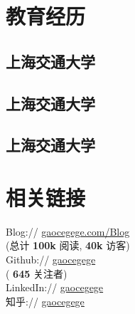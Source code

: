 \documentclass[]{deedy-resume-openfont}
\begin{document}
%
%
\lastupdated


%
%

\begin{minipage}[t]{0.3\textwidth}


\section{教育经历}
\sectionsep

\subsection{上海交通大学}
\sectionsep

\subsection{上海交通大学}
\sectionsep

\subsection{上海交通大学}
\sectionsep


\section{相关链接}
\sectionsep
Blog://  \href{http://gaocegege.com/Blog}{gaocegege.com/Blog} \\
{(总计\textbf{ 100k }阅读,\textbf{ 40k }访客)} \\
Github:// \href{https://github.com/gaocegege}{gaocegege} \\
{(\textbf{ 645 }关注者)} \\
LinkedIn://  \href{https://www.linkedin.com/in/gaocegege}{gaocegege} \\
知乎:// \href{https://www.zhihu.com/people/gaocegege}{gaocegege} \\
\sectionsep


\end{minipage}
\end{document}
